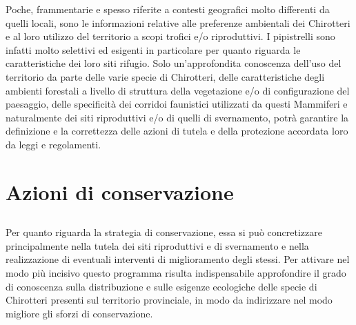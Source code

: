 \documentclass[10pt,twoside,openany,x11names,svgnames,italian,a5paper,dvipsnames,table]{memoir}
\newcommand\chapterillustration{}
\begin{document}
Poche, frammentarie e spesso riferite a contesti geografici molto differenti da quelli locali, sono le informazioni relative alle preferenze ambientali dei Chirotteri e al loro utilizzo del territorio a scopi trofici e/o riproduttivi. I pipistrelli sono infatti molto selettivi ed esigenti in particolare per quanto riguarda le caratteristiche dei loro siti rifugio. Solo un’approfondita conoscenza dell’uso del territorio da parte delle varie specie di Chirotteri, delle caratteristiche degli ambienti forestali a livello di struttura della vegetazione e/o di configurazione del paesaggio, delle specificità dei corridoi faunistici utilizzati da questi Mammiferi e naturalmente dei siti riproduttivi e/o di quelli di svernamento, potrà garantire la definizione e la correttezza delle azioni di tutela e della protezione accordata loro da leggi e regolamenti.

 
\chapter{Azioni di conservazione}
\renewcommand\chapterillustration{3.jpg}
\section*{}
Per quanto riguarda la strategia di conservazione, essa si può concretizzare principalmente nella tutela dei siti riproduttivi e di svernamento e nella realizzazione di eventuali interventi di miglioramento degli stessi. Per attivare nel modo più incisivo questo programma risulta indispensabile approfondire il grado di conoscenza sulla distribuzione e sulle esigenze ecologiche delle specie di Chirotteri presenti sul territorio provinciale, in modo da indirizzare nel modo migliore gli sforzi di conservazione.
\end{document}

